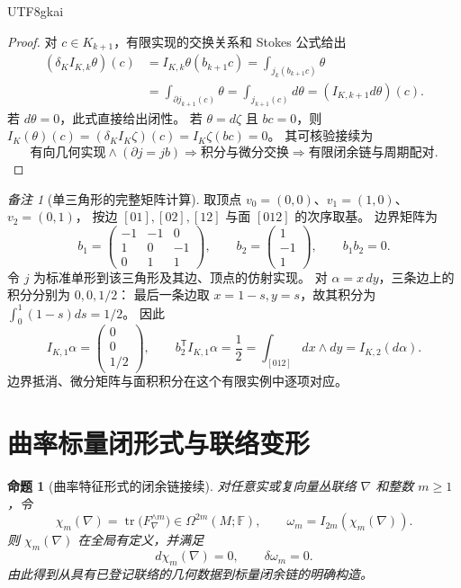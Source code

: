 \documentclass[12pt,a4paper,openany,notitlepage]{report}
\theoremstyle{plain}
\newtheorem{proposition}[theorem]{命题}
\theoremstyle{definition}
\theoremstyle{remark}
\newtheorem{remark}[theorem]{备注}
\begin{document}
\begin{CJK*}{UTF8}{gkai}
\begin{proof}
对 $c\in K_{k+1}$，有限实现的交换关系和 Stokes 公式给出
\[
\begin{aligned}
(\delta_K I_{K,k}\theta)(c)
&=I_{K,k}\theta(b_{k+1}c)
=\int_{j_k(b_{k+1}c)}\theta\\
&=\int_{\partial j_{k+1}(c)}\theta
=\int_{j_{k+1}(c)}d\theta
=(I_{K,k+1}d\theta)(c).
\end{aligned}
\]
若 $d\theta=0$，此式直接给出闭性。
若 $\theta=d\zeta$ 且 $b c=0$，则
$I_K(\theta)(c)=(\delta_KI_K\zeta)(c)=I_K\zeta(bc)=0$。
其可核验接续为
\[
\text{有向几何实现}\land(\partial j=jb)
\Longrightarrow\text{积分与微分交换}
\Longrightarrow\text{有限闭余链与周期配对}.
\]
\end{proof}

\begin{remark}[单三角形的完整矩阵计算]
取顶点 $v_0=(0,0)$、$v_1=(1,0)$、$v_2=(0,1)$，
按边 $[01],[02],[12]$ 与面 $[012]$ 的次序取基。
边界矩阵为
\[
b_1=\begin{pmatrix}-1&-1&0\\1&0&-1\\0&1&1\end{pmatrix},
\qquad b_2=\begin{pmatrix}1\\-1\\1\end{pmatrix},
\qquad b_1b_2=0.
\]
令 $j$ 为标准单形到该三角形及其边、顶点的仿射实现。
对 $\alpha=x\,dy$，三条边上的积分分别为 $0,0,1/2$：
最后一条边取 $x=1-s,y=s$，故其积分为 $\int_0^1(1-s)ds=1/2$。
因此
\[
I_{K,1}\alpha=\begin{pmatrix}0\\0\\1/2\end{pmatrix},
\qquad
b_2^{\mathsf T}I_{K,1}\alpha=\frac12
=\int_{[012]}dx\wedge dy=I_{K,2}(d\alpha).
\]
边界抵消、微分矩阵与面积积分在这个有限实例中逐项对应。
\end{remark}

\section{曲率标量闭形式与联络变形}
\label{exp:geo:section:curvature-classes}

\begin{proposition}[曲率特征形式的闭余链接续]
\label{hgov:geo:prop:curvature-cocycle}
对任意实或复向量丛联络 $\nabla$ 和整数 $m\ge1$，令
\[
\chi_m(\nabla)=\operatorname{tr}
\bigl(F_\nabla^{\wedge m}\bigr)\in\Omega^{2m}(M;\mathbb F),
\qquad
\omega_m=I_{2m}(\chi_m(\nabla)).
\]
则 $\chi_m(\nabla)$ 在全局有定义，并满足
\[
d\chi_m(\nabla)=0,\qquad\delta\omega_m=0.
\]
由此得到从具有已登记联络的几何数据到标量闭余链的明确构造。
\end{proposition}


\end{CJK*}
\end{document}
